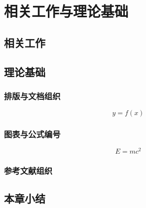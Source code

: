 \chapter{相关工作与理论基础}

\section{相关工作}
\placeholderpar{}

\section{理论基础}
\placeholderpar

\subsection{排版与文档组织}
\placeholderpar

\begin{equation}
  y = f(x)
\end{equation}

\subsection{图表与公式编号}
\placeholderpar

\begin{equation}
  E = mc^2
\end{equation}

\subsection{参考文献组织}
\placeholderpar

\section{本章小结}
\placeholderpar
